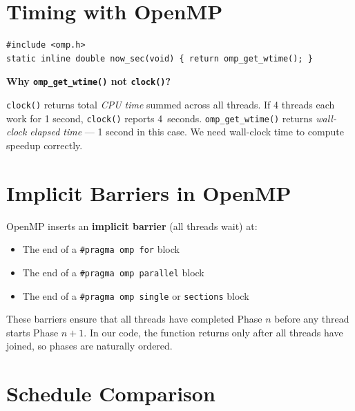 \documentclass[12pt,a4paper]{article}
\begin{document}
\section{Timing with OpenMP}

\begin{lstlisting}
#include <omp.h>
static inline double now_sec(void) { return omp_get_wtime(); }
\end{lstlisting}

\textbf{Why \texttt{omp\_get\_wtime()} not \texttt{clock()}?}

\texttt{clock()} returns total \emph{CPU time} summed across all threads.  If
4 threads each work for 1 second, \texttt{clock()} reports 4~seconds.
\texttt{omp\_get\_wtime()} returns \emph{wall-clock elapsed time} — 1 second
in this case.  We need wall-clock time to compute speedup correctly.

\section{Implicit Barriers in OpenMP}

OpenMP inserts an \textbf{implicit barrier} (all threads wait) at:
\begin{itemize}
    \item The end of a \texttt{\#pragma omp for} block
    \item The end of a \texttt{\#pragma omp parallel} block
    \item The end of a \texttt{\#pragma omp single} or \texttt{sections} block
\end{itemize}

These barriers ensure that all threads have completed Phase $n$ before
any thread starts Phase $n+1$.  In our code, the function returns only after
all threads have joined, so phases are naturally ordered.

\section{Schedule Comparison}
\end{document}
